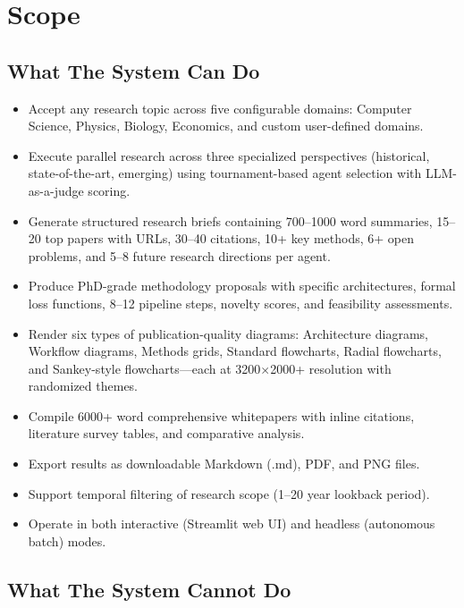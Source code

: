 \section{Scope}

\subsection{What The System Can Do}

\begin{itemize}[leftmargin=2cm]
\item Accept any research topic across five configurable domains: Computer Science, Physics, Biology, Economics, and custom user-defined domains.
\item Execute parallel research across three specialized perspectives (historical, state-of-the-art, emerging) using tournament-based agent selection with LLM-as-a-judge scoring.
\item Generate structured research briefs containing 700--1000 word summaries, 15--20 top papers with URLs, 30--40 citations, 10+ key methods, 6+ open problems, and 5--8 future research directions per agent.
\item Produce PhD-grade methodology proposals with specific architectures, formal loss functions, 8--12 pipeline steps, novelty scores, and feasibility assessments.
\item Render six types of publication-quality diagrams: Architecture diagrams, Workflow diagrams, Methods grids, Standard flowcharts, Radial flowcharts, and Sankey-style flowcharts---each at 3200$\times$2000+ resolution with randomized themes.
\item Compile 6000+ word comprehensive whitepapers with inline citations, literature survey tables, and comparative analysis.
\item Export results as downloadable Markdown (.md), PDF, and PNG files.
\item Support temporal filtering of research scope (1--20 year lookback period).
\item Operate in both interactive (Streamlit web UI) and headless (autonomous batch) modes.
\end{itemize}

\subsection{What The System Cannot Do}

